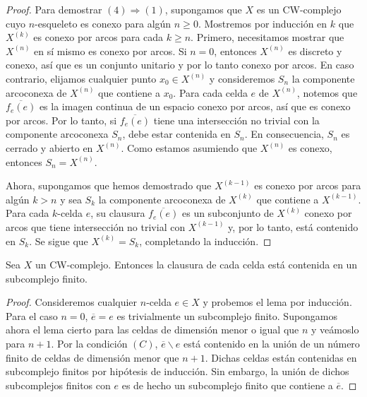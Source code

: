 \begin{proof}
	Para demostrar $(4) \Rightarrow (1)$, supongamos que $X$ es un CW-complejo cuyo
	$n$-esqueleto es conexo para algún $n \geq 0$. Mostremos por inducción en $k$
	que $X^{(k)}$ es conexo por arcos para cada $k \geq n$. Primero, necesitamos
	mostrar que $X^{(n)}$ en sí mismo es conexo por arcos. Si $n = 0$, entonces
	$X^{(n)}$ es discreto y conexo, así que es un conjunto unitario y por lo tanto
	conexo por arcos. En caso contrario, elijamos cualquier punto $x_{0}\in X^{(n)}$
	y consideremos $S_{n}$ la componente arcoconexa de $X^{(n)}$ que contiene a $x_{0}$.
	Para cada celda $e$ de $X^{(n)}$, notemos que $\overline{f_e(e)}$ es la imagen
	continua de un espacio conexo por arcos, así que es conexo por arcos. Por lo tanto,
	si $\overline{f_e(e)}$ tiene una intersección no trivial con la componente
	arcoconexa $S_{n}$, debe estar contenida en $S_{n}$. En consecuencia, $S_{n}$ es
	cerrado y abierto en $X^{(n)}$. Como estamos asumiendo que $X^{(n)}$ es conexo,
	entonces $S_{n}= X^{(n)}$.
	
	Ahora, supongamos que hemos demostrado que $X^{(k-1)}$ es conexo por arcos
	para algún $k > n$ y sea $S_{k}$ la componente arcoconexa de $X^{(k)}$ que
	contiene a $X^{(k-1)}$. Para cada $k$-celda $e$, su clausura
	$\overline{f_e(e)}$ es un subconjunto de $X^{(k)}$ conexo por arcos que tiene
	intersección no trivial con $X^{(k-1)}$ y, por lo tanto, está contenido en
	$S_{k}$. Se sigue que $X^{(k)}= S_{k}$, completando la inducción.
\end{proof}

\begin{lema}
	\label{lem:cw-cl-finite-subcomplex} Sea $X$ un CW-complejo. Entonces la
	clausura de cada celda está contenida en un subcomplejo finito.
\end{lema}
\begin{proof}
	Consideremos cualquier $n$-celda $e \in X$ y probemos el lema por inducción.
	Para el caso $n=0$, $\overline{e}= e$ es trivialmente un subcomplejo finito.
	Supongamos ahora el lema cierto para las celdas de dimensión menor o igual que
	$n$ y veámoslo para $n+1$. Por la condición $(C)$, $\overline{e}\backslash e$
	está contenido en la unión de un número finito de celdas de dimensión menor
	que $n+1$. Dichas celdas están contenidas en subcomplejo finitos por hipótesis
	de inducción. Sin embargo, la unión de dichos subcomplejos finitos con $e$ es de
	hecho un subcomplejo finito que contiene a $\overline{e}$.
\end{proof}

